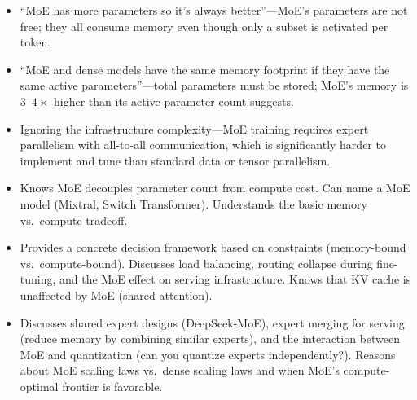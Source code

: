 \begin{interviewq}
\redflags
\begin{itemize}
    \item ``MoE has more parameters so it's always better''---MoE's parameters are not free; they all consume memory even though only a subset is activated per token.
    \item ``MoE and dense models have the same memory footprint if they have the same active parameters''---total parameters must be stored; MoE's memory is $3$--$4\times$ higher than its active parameter count suggests.
    \item Ignoring the infrastructure complexity---MoE training requires expert parallelism with all-to-all communication, which is significantly harder to implement and tune than standard data or tensor parallelism.
\end{itemize}


\goodgreat
\begin{itemize}
    \item {} Knows MoE decouples parameter count from compute cost. Can name a MoE model (Mixtral, Switch Transformer). Understands the basic memory vs.\ compute tradeoff.
    \item {} Provides a concrete decision framework based on constraints (memory-bound vs.\ compute-bound). Discusses load balancing, routing collapse during fine-tuning, and the MoE effect on serving infrastructure. Knows that KV cache is unaffected by MoE (shared attention).
    \item {} Discusses shared expert designs (DeepSeek-MoE), expert merging for serving (reduce memory by combining similar experts), and the interaction between MoE and quantization (can you quantize experts independently?). Reasons about MoE scaling laws vs.\ dense scaling laws and when MoE's compute-optimal frontier is favorable.
\end{itemize}

\end{interviewq}

